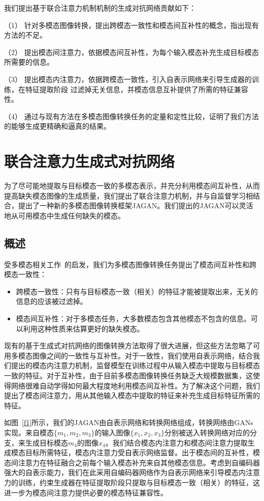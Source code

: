 
我们提出基于联合注意力机制机制的生成对抗网络贡献如下：

（1） 针对多模态图像转换，提出跨模态一致性和模态间互补性的概念，指出现有方法的不足。

（2） 提出模态间注意力，依据模态间互补性，为每个输入模态补充生成目标模态所需要的信息。

（3） 提出模态内注意力，依据跨模态一致性，引入自表示网络来引导生成器的训练，在特征提取阶段 过滤掉无关信息，并模态信息互补提供了所需的特征兼容性。

（4） 通过与现有方法在多模态图像转换任务的定量和定性比较，证明了我们方法的能够生成更精确和逼真的结果。

\section{联合注意力生成式对抗网络}
为了尽可能地提取与目标模态一致的多模态表示，并充分利用模态间互补性，从而提高缺失模态图像的生成质量，我们提出了联合注意力机制，并与自监督学习相结合，提出了一种新的多模态图像转换框架JAGAN。我们提出的JAGAN可以灵活地从可用模态中生成任何缺失的模态。

\subsection{概述}

受多模态相关工作~\cite{zhang2020deep}的启发，我们为多模态图像转换任务提出了模态间互补性和跨模态一致性：
\begin{itemize}
    \item 跨模态一致性：只有与目标模态一致（相关）的特征才能被提取出来，无关的信息的应该被过滤掉。
    \item 模态间互补性：对于多模态任务，大多数模态包含其他模态不包含的信息。可以利用这种性质来估算更好的缺失模态。
\end{itemize}

现有的基于生成式对抗网络的图像转换方法取得了很大进展，但这些方法忽略了可用多模态图像之间的一致性与互补性。对于一致性，我们使用自表示网络，结合我们提出的模态内注意力机制，监督模型在训练过程中从输入模态中提取与目标模态一致的特征。对于互补性，由于目前多模态图像转换任务缺乏大规模数据集，这使得网络很难自动学得如何最大程度地利用模态间互补性。为了解决这个问题，我们提出了模态间注意力，用从其他输入模态中提取的特征来补充生成目标特征所需的特征。

如图~\ref{f1}所示，我们的JAGAN由自表示网络和转换网络组成，转换网络由GANs实现。来自模态$\{m_1, m_2, m_3\}$的输入图像$\{x_1, x_2, x_3\}$分别被送入转换网络对应的分支，来生成目标模态$m_4$的图像$x_4$。我们结合模态内注意力和模态间注意力提取生成模态目标所需特征，模态内注意力受自表示网络监督。出于模态间的互补性，模态间注意力在特征融合之前每个输入模态补充来自其他模态信息。考虑到自编码器强大的自表示能力，我们在此采用自编码器网络作为自表示网络来引导模态内注意力的训练，约束生成器在特征提取阶段只提取与目标模态一致（相关）的特征，这进一步为模态间注意力提供必要的模态特征兼容性。

